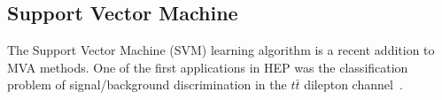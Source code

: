 \documentclass[a4paper]{jpconf}
\begin{document}








\subsection{Support Vector Machine}

The Support Vector Machine (SVM) learning algorithm is a recent addition to MVA methods.
One of the first applications in HEP was the classification problem 
of signal/background discrimination in the $t\bar{t}$ dilepton channel~\cite{svmtt}.
\end{document}
